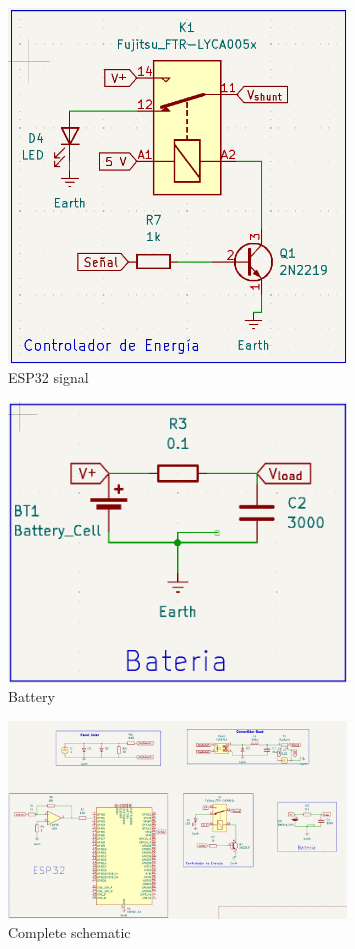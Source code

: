 \begin{figure}[H]
    \centering
    \includegraphics[width=0.8\textwidth]{image/ESQ4}
    \caption{ESP32 signal}\label{ESQ4}
\end{figure}

\begin{figure}[H]
    \centering
    \includegraphics[width=0.8\textwidth]{image/ESQ5}
    \caption{Battery}\label{ESQ5}
\end{figure}

\begin{figure}[H]
    \centering
    \includegraphics[width=0.8\textwidth]{image/ESQTOTAL}
    \caption{Complete schematic}\label{ESQTOTAL}
\end{figure} 